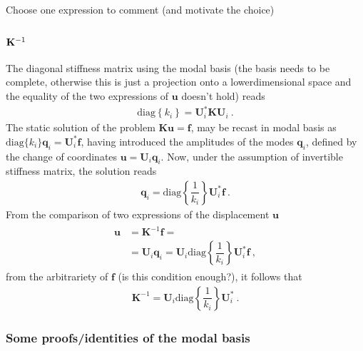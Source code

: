 \documentclass[letterpaper,10pt,english]{jupyterBook}
\begin{document}
\sphinxAtStartPar
{} Choose one expression to comment (and motivate the choice)
\subsubsection*{\protect\(\mathbf{K}^{-1}\protect\)}

\sphinxAtStartPar
The diagonal stiffness matrix using the modal basis (the basis needs to be complete, otherwise this is just a projection onto a lower\sphinxhyphen{}dimensional space and the equality of the two expressions of \(\mathbf{u}\) doesn’t hold) reads
\begin{equation*}
\begin{split}\text{diag}\left\{ k_i \right\} = \mathbf{U}_i^* \mathbf{K} \mathbf{U}_i \ .\end{split}
\end{equation*}
\sphinxAtStartPar
The static solution of the problem \(\mathbf{K} \mathbf{u} = \mathbf{f}\), may be recast in modal basis as \(\text{diag}\{ k_i \} \mathbf{q}_i = \mathbf{U}_i^* \mathbf{f}\), having introduced the amplitudes of the modes \(\mathbf{q}_i\), defined by the change of coordinates \(\mathbf{u} = \mathbf{U}_i \mathbf{q}_i\). Now, under the assumption of invertible stiffness matrix, the solution reads
\begin{equation*}
\begin{split}\mathbf{q}_i = \text{diag}\left\{ \dfrac{1}{k_i} \right\} \mathbf{U}_i^* \mathbf{f} \ .\end{split}
\end{equation*}
\sphinxAtStartPar
From the comparison of two expressions of the displacement \(\mathbf{u}\)
\begin{equation*}
\begin{split}\begin{aligned}
  \mathbf{u} & = \mathbf{K}^{-1} \mathbf{f} = \\
             & = \mathbf{U}_i \mathbf{q}_i = \mathbf{U}_i \text{diag} \left\{ \dfrac{1}{k_i} \right\} \mathbf{U}_i^* \mathbf{f} \ ,
\end{aligned}\end{split}
\end{equation*}
\sphinxAtStartPar
from the arbitrariety of \(\mathbf{f}\) (is this condition enough?), it follows that
\begin{equation*}
\begin{split}\mathbf{K}^{-1} = \mathbf{U}_i \text{diag} \left\{ \dfrac{1}{k_i} \right\} \mathbf{U}_i^* \ .\end{split}
\end{equation*}\subsubsection*{Some proofs/identities of the modal basis}
\end{document}
